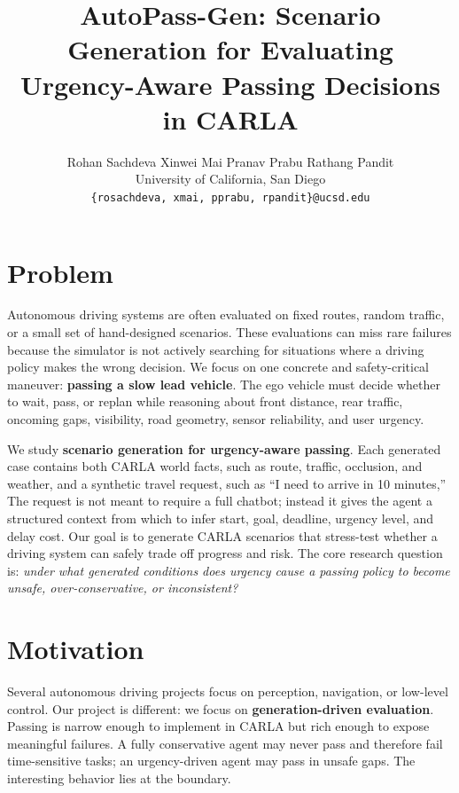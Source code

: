 \documentclass[10pt,twocolumn,letterpaper]{article}
\begin{document}
\title{AutoPass-Gen: Scenario Generation for Evaluating Urgency-Aware Passing Decisions in CARLA}

\author{
Rohan Sachdeva \quad Xinwei Mai \quad Pranav Prabu \quad Rathang Pandit \\
University of California, San Diego \\
{\tt\small \{rosachdeva, xmai, pprabu, rpandit\}@ucsd.edu}
}

\maketitle

\section{Problem}
Autonomous driving systems are often evaluated on fixed routes, random traffic, or a small set of hand-designed scenarios. These evaluations can miss rare failures because the simulator is not actively searching for situations where a driving policy makes the wrong decision. We focus on one concrete and safety-critical maneuver: \textbf{passing a slow lead vehicle}. The ego vehicle must decide whether to wait, pass, or replan while reasoning about front distance, rear traffic, oncoming gaps, visibility, road geometry, sensor reliability, and user urgency.

We study \textbf{scenario generation for urgency-aware passing}. Each generated case contains both CARLA world facts, such as route, traffic, occlusion, and weather, and a synthetic travel request, such as ``I need to arrive in 10 minutes,'' The request is not meant to require a full chatbot; instead it gives the agent a structured context from which to infer start, goal, deadline, urgency level, and delay cost. Our goal is to generate CARLA scenarios that stress-test whether a driving system can safely trade off progress and risk. The core research question is: \emph{under what generated conditions does urgency cause a passing policy to become unsafe, over-conservative, or inconsistent?}

\section{Motivation}
Several autonomous driving projects focus on perception, navigation, or low-level control. Our project is different: we focus on \textbf{generation-driven evaluation}. Passing is narrow enough to implement in CARLA but rich enough to expose meaningful failures. A fully conservative agent may never pass and therefore fail time-sensitive tasks; an urgency-driven agent may pass in unsafe gaps. The interesting behavior lies at the boundary.
\end{document}
